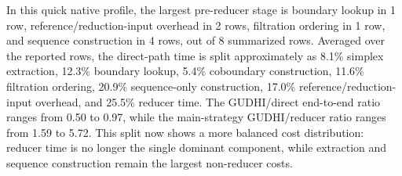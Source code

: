 In this quick native profile, the largest pre-reducer stage is boundary lookup in 1 row, reference/reduction-input overhead in 2 rows, filtration ordering in 1 row, and sequence construction in 4 rows, out of 8 summarized rows.  Averaged over the reported rows, the direct-path time is split approximately as 8.1\% simplex extraction, 12.3\% boundary lookup, 5.4\% coboundary construction, 11.6\% filtration ordering, 20.9\% sequence-only construction, 17.0\% reference/reduction-input overhead, and 25.5\% reducer time.  The GUDHI/direct end-to-end ratio ranges from 0.50 to 0.97, while the main-strategy GUDHI/reducer ratio ranges from 1.59 to 5.72.  This split now shows a more balanced cost distribution: reducer time is no longer the single dominant component, while extraction and sequence construction remain the largest non-reducer costs.
